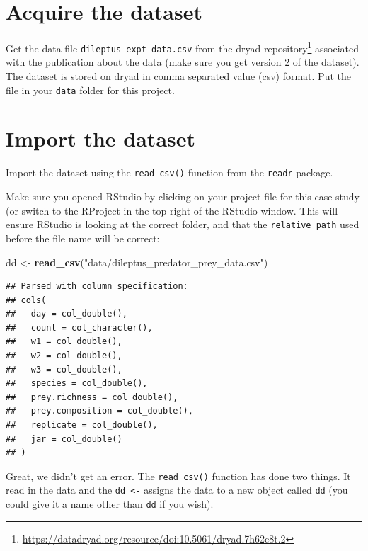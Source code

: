 \documentclass[]{book}
\makeatletter
\newenvironment{Shaded}{\begin{snugshade}}{\end{snugshade}}
\newcommand{\KeywordTok}[1]{\textcolor[rgb]{0.13,0.29,0.53}{\textbf{#1}}}
\newcommand{\NormalTok}[1]{#1}
\newcommand{\StringTok}[1]{\textcolor[rgb]{0.31,0.60,0.02}{#1}}
\renewcommand{\href}[2]{#2\footnote{\url{#1}}}
\newenvironment{kframe}{%
\medskip{}
\setlength{\fboxsep}{.8em}
 \def\at@end@of@kframe{}%
 \ifinner\ifhmode%
  \def\at@end@of@kframe{\end{minipage}}%
  \begin{minipage}{\columnwidth}%
 \fi\fi%
 \def\FrameCommand##1{\hskip\@totalleftmargin \hskip-\fboxsep
 \colorbox{shadecolor}{##1}\hskip-\fboxsep
     \hskip-\linewidth \hskip-\@totalleftmargin \hskip\columnwidth}%
 \MakeFramed {\advance\hsize-\width
   \@totalleftmargin\z@ \linewidth\hsize
   \@setminipage}}%
 {\par\unskip\endMakeFramed%
 \at@end@of@kframe}
\newenvironment{rmdblock}[1]
  {
  \begin{itemize}
  \renewcommand{\labelitemi}{
    \raisebox{-.7\height}[0pt][0pt]{
      {\setkeys{Gin}{width=3em,keepaspectratio}\texttt{[image: images/\#1]}}
    }
  }
  \setlength{\fboxsep}{1em}
  \begin{kframe}
  \item
  }
  {
  \end{kframe}
  \end{itemize}
  }
\newenvironment{warning}
  {\begin{rmdblock}{warning}}
  {\end{rmdblock}}
\makeatother
\begin{document}
\hypertarget{acquire-the-dataset}{%
\section{Acquire the dataset}\label{acquire-the-dataset}}

Get the data file \texttt{dileptus\ expt\ data.csv} from the \href{https://datadryad.org/resource/doi:10.5061/dryad.7h62c8t.2}{dryad repository} associated with the publication about the data (make sure you get version 2 of the dataset). The dataset is stored on dryad in comma separated value (csv) format. Put the file in your \texttt{data} folder for this project.

\hypertarget{import-the-dataset}{%
\section{Import the dataset}\label{import-the-dataset}}

Import the dataset using the \texttt{read\_csv()} function from the \texttt{readr} package.

\begin{warning}
Make sure you opened RStudio by clicking on your project file for this
case study (or switch to the RProject in the top right of the RStudio
window. This will ensure RStudio is looking at the correct folder, and
that the \texttt{relative\ path} used before the file name will be
correct:
\end{warning}

\begin{Shaded}
\begin{Highlighting}[]
\NormalTok{dd <-}\StringTok{ }\KeywordTok{read_csv}\NormalTok{(}\StringTok{"data/dileptus_predator_prey_data.csv"}\NormalTok{)}
\end{Highlighting}
\end{Shaded}

\begin{verbatim}
## Parsed with column specification:
## cols(
##   day = col_double(),
##   count = col_character(),
##   w1 = col_double(),
##   w2 = col_double(),
##   w3 = col_double(),
##   species = col_double(),
##   prey.richness = col_double(),
##   prey.composition = col_double(),
##   replicate = col_double(),
##   jar = col_double()
## )
\end{verbatim}

Great, we didn't get an error. The \texttt{read\_csv()} function has done two things. It read in the data and the \texttt{dd\ \textless{}-} assigns the data to a new object called \texttt{dd} (you could give it a name other than \texttt{dd} if you wish).
\end{document}
